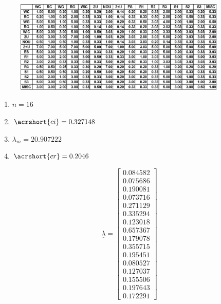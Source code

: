 \documentclass[aspectratio=1610,pdftex,dvipsnames,compress,xcolor={dvipsnames}]{beamer}
\newcommand{\acs}{\acrshort} %
\begin{document}
\begin{frame}{}
    \begin{figure}
        \centering
        \includegraphics[width=0.90\textwidth]{ahp_apartment.jpg}
    \end{figure}

    \begin{enumerate}[series=outerlist,topsep=0pt,itemsep=1pt,leftmargin=*,label=(\arabic*)]
        \item[]$n = 16$
        \item[]$\acs{ci} = 0.327148$
        \item[]$\lambda_m = 20.907222$
        \item[]$\acs{cr} = 0.2046$
    \end{enumerate}
\end{frame}


\begin{frame}{}
    \begin{equation}
        \underline{\lambda} = 
        \begin{bmatrix}
            0.084582 \\
            0.075686 \\
            0.190081 \\
            0.073716 \\
            0.271129 \\
            0.335294 \\
            0.123018 \\
            0.657367 \\
            0.179078 \\
            0.355715 \\
            0.195451 \\
            0.080527 \\
            0.127037 \\
            0.155506 \\
            0.197643 \\
            0.172291
        \end{bmatrix}
    \end{equation}
\end{frame}
\end{document}
